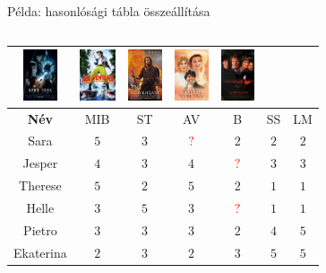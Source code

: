 \documentclass[english, aspectratio=169]{beamer}
\begin{document}
\begin{frame}{Példa: hasonlósági tábla összeállítása}
{\begin{columns}
\begin{column}{.8\textwidth}
\begin{center}
\begin{footnotesize}
\begin{tabular}{|c|c|c|c|c|c|c|}
\includegraphics[height=1.5cm, keepaspectratio]{images/movies/star_trek.png} &
\includegraphics[height=1.5cm, keepaspectratio]{images/movies/ace_ventura.png} &
\includegraphics[height=1.5cm, keepaspectratio]{images/movies/braveheart.png} &
\includegraphics[height=1.5cm, keepaspectratio]{images/movies/sense_and_sensibility.png} &
\includegraphics[height=1.5cm, keepaspectratio]{images/movies/les_miserables.png} \\
\hline
\textbf{Név} & MIB & ST & AV & B & SS & LM\\ 
\hline
Sara & $5$ & $3$ & \textcolor{red}{$?$} & $2$ & $2$ & $2$\\
\hline
Jesper & $4$ & $3$ & $4$ & \textcolor{red}{$?$} & $3$ & $3$\\
\hline
Therese & $5$ & $2$ & $5$ & $2$ & $1$ & $1$\\
\hline
Helle & $3$ & $5$ & $3$ & \textcolor{red}{$?$} & $1$ & $1$\\
\hline
Pietro & $3$ & $3$ & $3$ & $2$ & $4$ & $5$\\
\hline
Ekaterina & $2$ & $3$ & $2$ & $3$ & $5$ & $5$\\
\hline
\end{tabular}
\end{footnotesize}
\end{center}
\end{column}
\end{columns}}
\end{frame}
\end{document}
